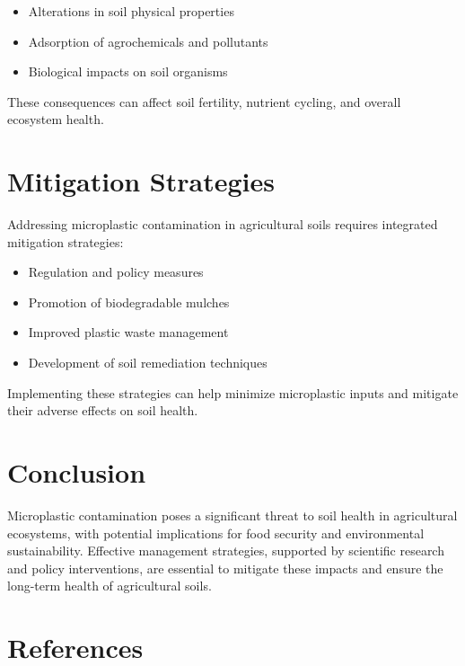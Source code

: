 \documentclass[12pt]{article}
\begin{document}
\begin{itemize}
    \item Alterations in soil physical properties
    \item Adsorption of agrochemicals and pollutants
    \item Biological impacts on soil organisms
\end{itemize}

These consequences can affect soil fertility, nutrient cycling, and overall ecosystem health.

\section{Mitigation Strategies}
Addressing microplastic contamination in agricultural soils requires integrated mitigation strategies:

\begin{itemize}
    \item Regulation and policy measures
    \item Promotion of biodegradable mulches
    \item Improved plastic waste management
    \item Development of soil remediation techniques
\end{itemize}

Implementing these strategies can help minimize microplastic inputs and mitigate their adverse effects on soil health.

\section{Conclusion}
Microplastic contamination poses a significant threat to soil health in agricultural ecosystems, with potential implications for food security and environmental sustainability. Effective management strategies, supported by scientific research and policy interventions, are essential to mitigate these impacts and ensure the long-term health of agricultural soils.

\section*{References}


\end{document}
